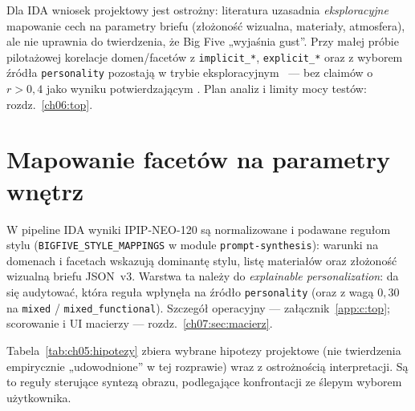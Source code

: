 Dla IDA wniosek projektowy jest ostrożny: literatura uzasadnia \emph{eksploracyjne} mapowanie cech na parametry briefu (złożoność wizualna, materiały, atmosfera), ale nie uprawnia do twierdzenia, że Big Five „wyjaśnia gust”.
Przy małej próbie pilotażowej korelacje domen/facetów z \texttt{implicit\_*}, \texttt{explicit\_*} oraz z wyborem źródła \texttt{personality} pozostają w trybie eksploracyjnym~ --- bez claimów o $r\!>\!0{,}4$ jako wyniku potwierdzającym \parencite{idaPlatform2026}.
Plan analiz i limity mocy testów: rozdz.~\ref{ch06:top}.

\section{Mapowanie facetów na parametry wnętrz}
\label{ch05:sec:mapowanie}

W pipeline IDA wyniki IPIP-NEO-120 są normalizowane i podawane regułom stylu
(\texttt{BIGFIVE\_STYLE\_MAPPINGS} w module \texttt{prompt-synthesis}):
warunki na domenach i facetach wskazują dominantę stylu, listę materiałów oraz złożoność wizualną briefu JSON~v3.
Warstwa ta należy do \emph{explainable personalization}: da się audytować, która reguła wpłynęła na źródło \texttt{personality} (oraz z wagą $0{,}30$ na \texttt{mixed} / \texttt{mixed\_functional}).
Szczegół operacyjny --- załącznik~\ref{app:c:top}; scorowanie i UI macierzy --- rozdz.~\ref{ch07:sec:macierz}.

Tabela~\ref{tab:ch05:hipotezy} zbiera wybrane hipotezy projektowe (nie twierdzenia empirycznie „udowodnione” w tej rozprawie) wraz z ostrożnością interpretacji.
Są to reguły sterujące syntezą obrazu, podlegające konfrontacji ze ślepym wyborem użytkownika.

